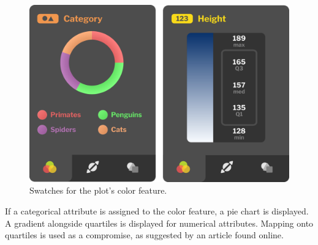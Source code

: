 \documentclass[thesis=M,english,hidelinks]{FITthesisXE}[2012/06/26]
\begin{document}
\begin{figure}[ht]
\centering
\includegraphics[scale=0.075]{statistics_color}
\caption{Swatches for the plot's color feature.}
\label{fig:statistics_color}
\end{figure}

If a categorical attribute is assigned to the color feature, a pie chart is displayed. A gradient alongside quartiles is displayed for numerical attributes. Mapping onto quartiles is used as a compromise, as suggested by an article found online.\autocite{colormapping}
\end{document}
